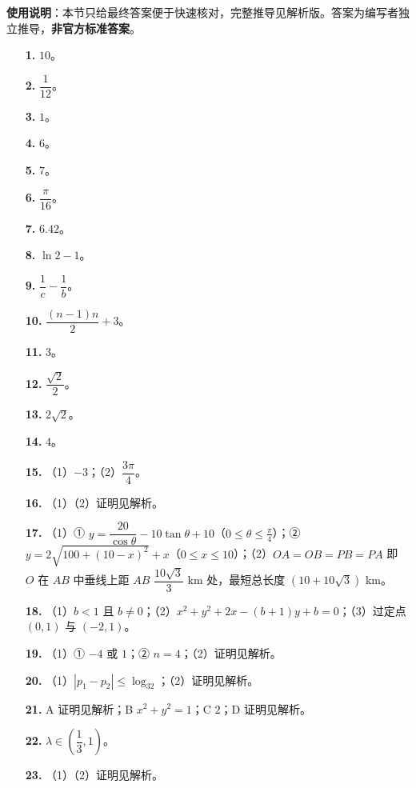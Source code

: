 
\begin{gknotice}
\textbf{使用说明}：本节只给最终答案便于快速核对，完整推导见解析版。答案为编写者独立推导，\textbf{非官方标准答案}。
\end{gknotice}

\begin{itemize}[leftmargin=2.6em]
  \item[\textbf{1.}] $10$。
  \item[\textbf{2.}] $\dfrac1{12}$。
  \item[\textbf{3.}] $1$。
  \item[\textbf{4.}] $6$。
  \item[\textbf{5.}] $7$。
  \item[\textbf{6.}] $\dfrac{\pi}{16}$。
  \item[\textbf{7.}] $6.42$。
  \item[\textbf{8.}] $\ln2-1$。
  \item[\textbf{9.}] $\dfrac1c-\dfrac1b$。
  \item[\textbf{10.}] $\dfrac{(n-1)n}2+3$。
  \item[\textbf{11.}] $3$。
  \item[\textbf{12.}] $\dfrac{\sqrt2}2$。
  \item[\textbf{13.}] $2\sqrt2$。
  \item[\textbf{14.}] $4$。
\end{itemize}

\begin{itemize}[leftmargin=2.6em]
  \item[\textbf{15.}] （1）$-3$；（2）$\dfrac{3\pi}4$。
  \item[\textbf{16.}] （1）（2）证明见解析。
  \item[\textbf{17.}] （1）① $y=\dfrac{20}{\cos\theta}-10\tan\theta+10$（$0\leqslant\theta\leqslant\frac{\pi}4$）；② $y=2\sqrt{100+(10-x)^2}+x$（$0\leqslant x\leqslant10$）；（2）$OA=OB=PB=PA$ 即 $O$ 在 $AB$ 中垂线上距 $AB$ $\dfrac{10\sqrt3}3$ km 处，最短总长度 $\left(10+10\sqrt3\right)$ km。
  \item[\textbf{18.}] （1）$b<1$ 且 $b\neq0$；（2）$x^2+y^2+2x-(b+1)y+b=0$；（3）过定点 $(0,1)$ 与 $(-2,1)$。
  \item[\textbf{19.}] （1）① $-4$ 或 $1$；② $n=4$；（2）证明见解析。
  \item[\textbf{20.}] （1）$|p_1-p_2|\leqslant\log_32$；（2）证明见解析。
\end{itemize}

\begin{itemize}[leftmargin=2.6em]
  \item[\textbf{21.}] A 证明见解析；B $x^2+y^2=1$；C $2$；D 证明见解析。
  \item[\textbf{22.}] $\lambda\in\left(\dfrac13,1\right)$。
  \item[\textbf{23.}] （1）（2）证明见解析。
\end{itemize}

